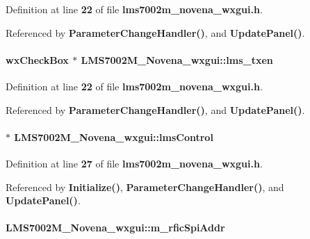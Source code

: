Definition at line {\bf 22} of file {\bf lms7002m\+\_\+novena\+\_\+wxgui.\+h}.



Referenced by {\bf Parameter\+Change\+Handler()}, and {\bf Update\+Panel()}.

\paragraph[{lms\+\_\+txen}]{\setlength{\rightskip}{0pt plus 5cm}wx\+Check\+Box $\ast$ L\+M\+S7002\+M\+\_\+\+Novena\+\_\+wxgui\+::lms\+\_\+txen}\label{classLMS7002M__Novena__wxgui_a463a28a6fc8899fd9f5371b9de18abd5}


Definition at line {\bf 22} of file {\bf lms7002m\+\_\+novena\+\_\+wxgui.\+h}.



Referenced by {\bf Parameter\+Change\+Handler()}, and {\bf Update\+Panel()}.

\paragraph[{lms\+Control}]{$\ast$ L\+M\+S7002\+M\+\_\+\+Novena\+\_\+wxgui\+::lms\+Control\hspace{0.3cm}{\ttfamily [protected]}}\label{classLMS7002M__Novena__wxgui_a70aa27277070e7a16ec3a726ed1fc846}


Definition at line {\bf 27} of file {\bf lms7002m\+\_\+novena\+\_\+wxgui.\+h}.



Referenced by {\bf Initialize()}, {\bf Parameter\+Change\+Handler()}, and {\bf Update\+Panel()}.

\paragraph[{m\+\_\+rfic\+Spi\+Addr}]{ L\+M\+S7002\+M\+\_\+\+Novena\+\_\+wxgui\+::m\+\_\+rfic\+Spi\+Addr\hspace{0.3cm}{\ttfamily [protected]}}\label{classLMS7002M__Novena__wxgui_ae11c823054b483c0ff337b2a2cfb42f3}


